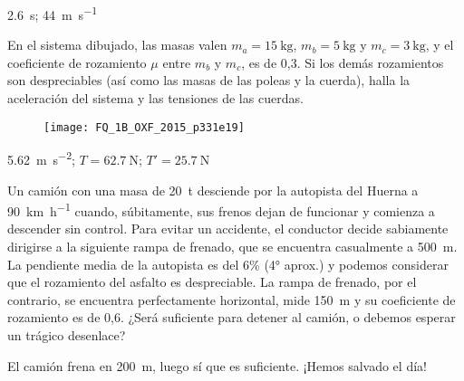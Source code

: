 \begin{solution}
  \SI{2.6}{\second}; \SI{44}{\meter\per\second}
\end{solution}



\begin{exercise}[
    tags    = {dinámica, poleas, rozamiento, bloques, cuerpo libre},
    topics  = {física, dinámica, leyes de newton},
    source  = {FQ 1B OXF 2015, p331, e19},
  ]
  En el sistema dibujado, las masas valen \( m_a = \SI{15}{\kilo\gram} \),
  \( m_b = \SI{5}{\kilo\gram} \) y \( m_c = \SI{3}{\kilo\gram} \), y el coeficiente de rozamiento \(\mu\) entre \( m_b \)  y \( m_c \), es de 0,3. Si los demás rozamientos son despreciables (así como las masas de las poleas y la cuerda), halla la aceleración del sistema y las tensiones de las cuerdas.
  \begin{figure}[h]
    \centering
    \texttt{[image: FQ\_1B\_OXF\_2015\_p331e19]}
  \end{figure}
\end{exercise}

\begin{solution}
  \SI{5,62}{\meter\per\square\second}; \( T = \SI{62,7}{\newton} \); \( T' = \SI{25,7}{\newton} \)
\end{solution}




\begin{exercise}[
    tags    = {energía cinética, energía potencial, trabajo, energía mecánica},
    topics  = {física, energía, trabajo},
    source  = {propio},
  ]
  Un camión con una masa de \SI{20}{t} desciende por la autopista del Huerna a \SI{90}{\kilo\meter\per\hour} cuando, súbitamente, sus frenos dejan de funcionar y comienza a descender sin control. Para evitar un accidente, el conductor decide sabiamente dirigirse a la siguiente rampa de frenado, que se encuentra casualmente a \SI{500}{\meter}. La pendiente media de la autopista es del 6\% (\ang{4} aprox.) y podemos considerar que el rozamiento del asfalto es despreciable. La rampa de frenado, por el contrario, se encuentra perfectamente horizontal, mide \SI{150}{\meter} y su coeficiente de rozamiento es de 0,6. ¿Será suficiente para detener al camión, o debemos esperar un trágico desenlace?
\end{exercise}

\begin{solution}
  El camión frena en \SI{200}{\meter}, luego sí que es suficiente. ¡Hemos salvado el día!
\end{solution}
